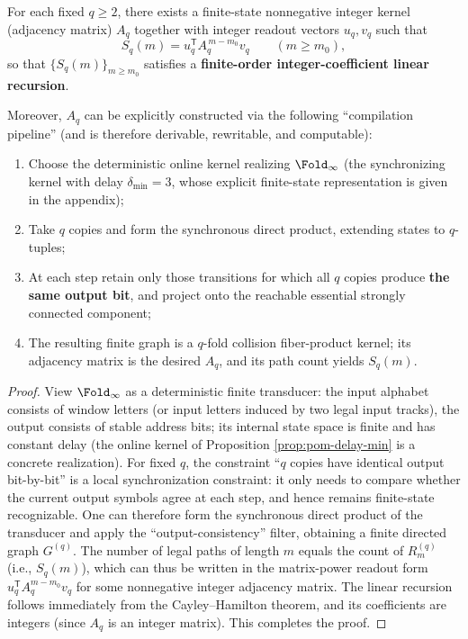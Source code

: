 \begin{proposition}\label{prop:pom-moment-kernel-exists}
For each fixed \(q\ge 2\), there exists a finite-state nonnegative integer kernel (adjacency matrix) \(A_q\) together with integer readout vectors \(u_q,v_q\) such that
$$
S_q(m)=u_q^{\mathsf T}A_q^{\,m-m_0}v_q\qquad(m\ge m_0),
$$
so that \(\{S_q(m)\}_{m\ge m_0}\) satisfies a \textbf{finite-order integer-coefficient linear recursion}.

Moreover, \(A_q\) can be explicitly constructed via the following ``compilation pipeline'' (and is therefore derivable, rewritable, and computable):
\begin{enumerate}
  \item Choose the deterministic online kernel realizing \(\Fold_\infty\) (the synchronizing kernel with delay \(\delta_{\min}=3\), whose explicit finite-state representation is given in the appendix);
  \item Take \(q\) copies and form the synchronous direct product, extending states to \(q\)-tuples;
  \item At each step retain only those transitions for which all \(q\) copies produce \textbf{the same output bit}, and project onto the reachable essential strongly connected component;
  \item The resulting finite graph is a \(q\)-fold collision fiber-product kernel; its adjacency matrix is the desired \(A_q\), and its path count yields \(S_q(m)\).
\end{enumerate}
\end{proposition}

\begin{proof}
View \(\Fold_\infty\) as a deterministic finite transducer: the input alphabet consists of window letters (or input letters induced by two legal input tracks), the output consists of stable address bits; its internal state space is finite and has constant delay (the online kernel of Proposition \ref{prop:pom-delay-min} is a concrete realization).
For fixed \(q\), the constraint ``\(q\) copies have identical output bit-by-bit'' is a local synchronization constraint: it only needs to compare whether the current output symbols agree at each step, and hence remains finite-state recognizable.
One can therefore form the synchronous direct product of the transducer and apply the ``output-consistency'' filter, obtaining a finite directed graph \(G^{(q)}\).
The number of legal paths of length \(m\) equals the count of \(R_m^{(q)}\) (i.e., \(S_q(m)\)), which can thus be written in the matrix-power readout form \(u_q^{\mathsf T}A_q^{m-m_0}v_q\) for some nonnegative integer adjacency matrix.
The linear recursion follows immediately from the Cayley--Hamilton theorem, and its coefficients are integers (since \(A_q\) is an integer matrix). This completes the proof.
\end{proof}

